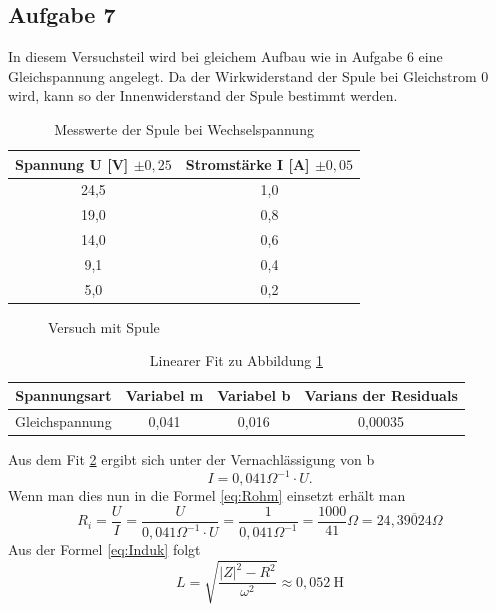 \subsection{Aufgabe 7}
In diesem Versuchsteil wird bei gleichem Aufbau wie in Aufgabe 6 eine Gleichspannung angelegt. Da der Wirkwiderstand der Spule bei Gleichstrom 0 wird, kann so der Innenwiderstand der Spule bestimmt werden.
\begin{table}[H]
  \centering
  \begin{tabular}{c | c }
    Spannung U [V] $\pm0,25$ & Stromstärke I [A] $\pm 0,05$ \\ \hline
    24,5 & 1,0 \\
    19,0 & 0,8\\
	14,0 & 0,6 \\
    9,1 & 0,4 \\
    5,0 & 0,2 \\ 
  \end{tabular}
  \caption{Messwerte der Spule bei Wechselspannung}
  \label{tab:messungspulegleich}
\end{table}
\begin{figure}[H]
  \centering
  \caption{Versuch mit Spule}
  \label{fig:UIGleichSpule}
\end{figure}
\begin{table}[H]
  \centering
  \begin{tabular}{c | c | c | c}
    Spannungsart & Variabel m & Variabel b & Varians der Residuals\\ \hline
    Gleichspannung & 0,041 & 0,016 & 0,00035
  \end{tabular}
  \caption{Linearer Fit zu Abbildung \ref{fig:UIGleichSpule}}
  \label{tab:fitUIGleichSpule}
\end{table}
Aus dem Fit \ref{tab:fitUIGleichSpule} ergibt sich unter der Vernachlässigung von b
\begin{equation}
I=0,041\Omega^{-1}\cdot U.
\end{equation}
Wenn man dies nun in die Formel \ref{eq:Rohm} einsetzt erhält man
\begin{equation}
R_i=\frac{U}{I}=\frac{U}{0,041\Omega^{-1}\cdot U}=\frac{1}{0,041\Omega^{-1}}= \frac{1000}{41}\Omega = 24,\overline{39024} \Omega
\end{equation}
Aus der Formel \eqref{eq:Induk} folgt
\begin{equation}
L=\sqrt{\frac{|Z|^2-R^2}{\omega^2}}\approx 0,052~\si{\henry}
\end{equation}
